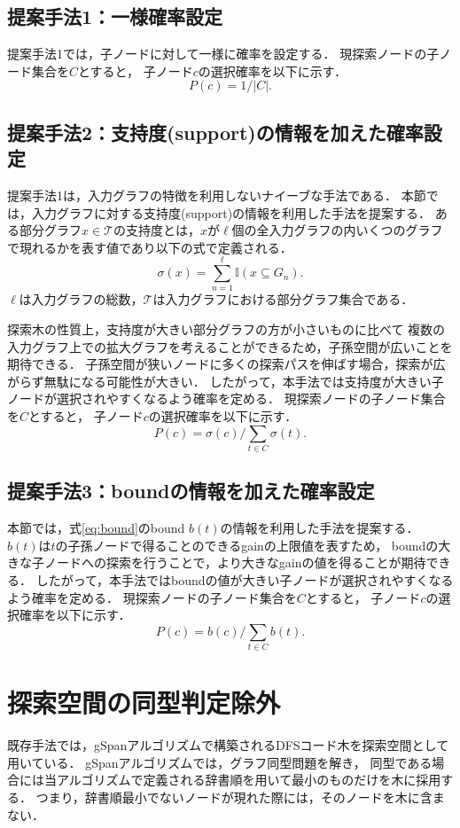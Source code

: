 \subsection{提案手法1：一様確率設定}
提案手法1では，子ノードに対して一様に確率を設定する．
現探索ノードの子ノード集合を$C$とすると，
子ノード$c$の選択確率を以下に示す．
\[
	P(c) = 1 / |C|.
\]

\subsection{提案手法2：支持度(support)の情報を加えた確率設定}
提案手法1は，入力グラフの特徴を利用しないナイーブな手法である．
本節では，入力グラフに対する支持度(support)の情報を利用した手法を提案する．
ある部分グラフ$x \in \mathcal{T}$の支持度とは，$x$が$\ell$個の全入力グラフの内いくつのグラフで現れるかを表す値であり以下の式で定義される．
\[
	\sigma(x) = \sum_{n=1}^{\ell} \mathbb{I} (x \subseteq G_n) .
\]
$\ell$は入力グラフの総数，$\mathcal{T}$は入力グラフにおける部分グラフ集合である．

探索木の性質上，支持度が大きい部分グラフの方が小さいものに比べて
複数の入力グラフ上での拡大グラフを考えることができるため，子孫空間が広いことを期待できる．
子孫空間が狭いノードに多くの探索パスを伸ばす場合，探索が広がらず無駄になる可能性が大きい．
したがって，本手法では支持度が大きい子ノードが選択されやすくなるよう確率を定める．
現探索ノードの子ノード集合を$C$とすると，
子ノード$c$の選択確率を以下に示す．
\[
	P(c) = \sigma(c) / \sum_{t \in C} \sigma(t).
\]

\subsection{提案手法3：boundの情報を加えた確率設定}
本節では，式\eqref{eq:bound}のbound $b(t)$の情報を利用した手法を提案する．
$b(t)$は$t$の子孫ノードで得ることのできるgainの上限値を表すため，
boundの大きな子ノードへの探索を行うことで，より大きなgainの値を得ることが期待できる．
したがって，本手法ではboundの値が大きい子ノードが選択されやすくなるよう確率を定める．
現探索ノードの子ノード集合を$C$とすると，
子ノード$c$の選択確率を以下に示す．
\[
	P(c)  =  b(c) / \sum_{t \in C} b(t).
\]

\section{探索空間の同型判定除外}
\label{search space}
既存手法では，gSpan\cite{gSpan}アルゴリズムで構築されるDFSコード木を探索空間として用いている．
gSpanアルゴリズムでは，グラフ同型問題を解き，
同型である場合には当アルゴリズムで定義される辞書順を用いて最小のものだけを木に採用する．
つまり，辞書順最小でないノードが現れた際には，そのノードを木に含まない．

